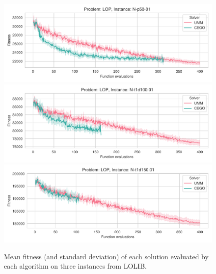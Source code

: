 \documentclass[runningheads]{llncs}
\begin{document}
\begin{figure}[!tbp]
  \centering%
  \includegraphics[width=\textwidth]{../img/fitness_real_lop_RandB_N-p50-01}\\
  \includegraphics[width=\textwidth]{../img/fitness_real_lop_RandA1_N-t1d100_01}\\
  \includegraphics[width=\textwidth]{../img/fitness_real_lop_RandA1_N-t1d150_01}\\
    \caption{Mean fitness  (and standard deviation)  of each solution evaluated by each algorithm on three instances from LOLIB.\label{fig:lolib}}
  \end{figure}
\end{document}
